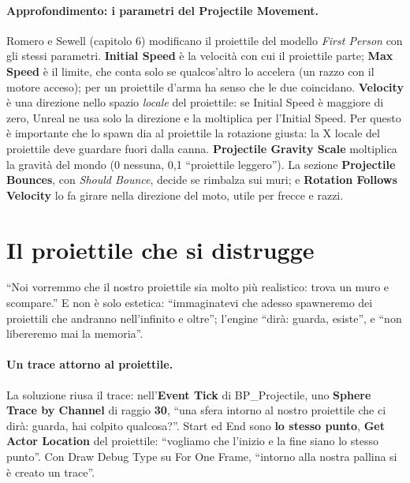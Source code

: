 \paragraph{Approfondimento: i parametri del Projectile Movement.} Romero e Sewell
(capitolo 6) modificano il proiettile del modello \emph{First Person} con gli stessi
parametri. \textbf{Initial Speed} è la velocità con cui il proiettile parte; \textbf{Max
Speed} è il limite, che conta solo se qualcos'altro lo accelera (un razzo con il motore
acceso); per un proiettile d'arma ha senso che le due coincidano. \textbf{Velocity} è
una direzione nello spazio \emph{locale} del proiettile: se Initial Speed è maggiore di
zero, Unreal ne usa solo la direzione e la moltiplica per l'Initial Speed. Per questo
è importante che lo spawn dia al proiettile la rotazione giusta: la X locale del
proiettile deve guardare fuori dalla canna. \textbf{Projectile Gravity Scale} moltiplica
la gravità del mondo (0 nessuna, 0,1 ``proiettile leggero''). La sezione \textbf{Projectile
Bounces}, con \emph{Should Bounce}, decide se rimbalza sui muri; e \textbf{Rotation Follows
Velocity} lo fa girare nella direzione del moto, utile per frecce e razzi.

\section{Il proiettile che si distrugge}
\label{ue5:sec:distruzione}

``Noi vorremmo che il nostro proiettile sia molto più realistico: trova un muro e
scompare.'' E non è solo estetica: ``immaginatevi che adesso spawneremo dei proiettili
che andranno nell'infinito e oltre''; l'engine ``dirà: guarda, esiste'', e ``non
libereremo mai la memoria''.

\paragraph{Un trace attorno al proiettile.} La soluzione riusa il trace: nell'\textbf{Event
Tick} di BP\_Projectile, uno \textbf{Sphere Trace by Channel} di raggio \textbf{30},
``una sfera intorno al nostro proiettile che ci dirà: guarda, hai colpito qualcosa?''.
Start ed End sono \textbf{lo stesso punto}, \textbf{Get Actor Location} del proiettile:
``vogliamo che l'inizio e la fine siano lo stesso punto''. Con Draw Debug Type su For
One Frame, ``intorno alla nostra pallina si è creato un trace''.

